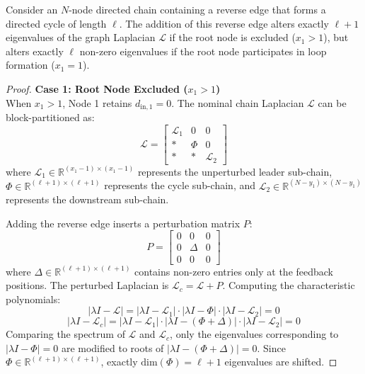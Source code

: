 \begin{theo}\label{theo12}
\leavevmode\par\noindent
Consider an $N$-node directed chain containing a reverse edge that forms a directed cycle of length $\ell$. The addition of this reverse edge alters exactly $\ell+1$ eigenvalues of the graph Laplacian $\mathcal{L}$ if the root node is excluded ($x_1 > 1$), but alters exactly $\ell$ non-zero eigenvalues if the root node participates in loop formation ($x_1 = 1$).
\end{theo}
\begin{proof}
\textbf{Case 1: Root Node Excluded ($x_1 > 1$)}\\
When $x_1 > 1$, Node 1 retains $d_{\text{in}, 1} = 0$. The nominal chain Laplacian $\mathcal{L}$ can be block-partitioned as:
\begin{equation}
	\mathcal{L} = \begin{bmatrix}
		\mathcal{L}_1 & 0 & 0 \\
		* & \Phi & 0 \\
		* & * & \mathcal{L}_2
	\end{bmatrix}
\end{equation}
where $\mathcal{L}_1 \in \mathbb{R}^{(x_1-1) \times (x_1-1)}$ represents the unperturbed leader sub-chain, $\Phi \in \mathbb{R}^{(\ell+1) \times (\ell+1)}$ represents the cycle sub-chain, and $\mathcal{L}_2 \in \mathbb{R}^{(N-y_1) \times (N-y_1)}$ represents the downstream sub-chain. 

Adding the reverse edge inserts a perturbation matrix $P$:
\begin{equation}
	P = \begin{bmatrix}
		0 & 0 & 0 \\
		0 & \Delta & 0 \\
		0 & 0 & 0
	\end{bmatrix}
\end{equation}
where $\Delta \in \mathbb{R}^{(\ell+1) \times (\ell+1)}$ contains non-zero entries only at the feedback positions. The perturbed Laplacian is $\mathcal{L}_c = \mathcal{L} + P$. Computing the characteristic polynomials:
\begin{equation}
	|\lambda I - \mathcal{L}| = |\lambda I - \mathcal{L}_1| \cdot |\lambda I - \Phi| \cdot |\lambda I - \mathcal{L}_2| = 0
\end{equation}
\begin{equation}
	|\lambda I - \mathcal{L}_c| = |\lambda I - \mathcal{L}_1| \cdot |\lambda I - (\Phi + \Delta)| \cdot |\lambda I - \mathcal{L}_2| = 0
\end{equation}
Comparing the spectrum of $\mathcal{L}$ and $\mathcal{L}_c$, only the eigenvalues corresponding to $|\lambda I - \Phi| = 0$ are modified to roots of $|\lambda I - (\Phi + \Delta)| = 0$. Since $\Phi \in \mathbb{R}^{(\ell+1) \times (\ell+1)}$, exactly $\text{dim}(\Phi) = \ell+1$ eigenvalues are shifted.


\end{proof}

